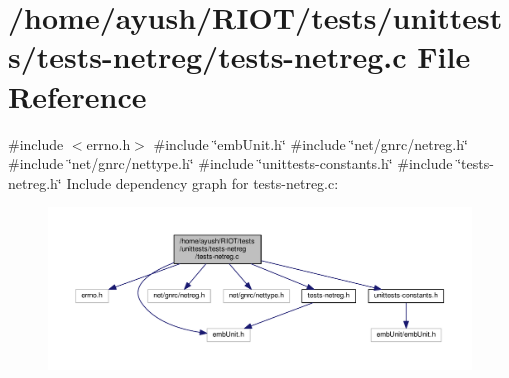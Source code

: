 \hypertarget{tests-netreg_8c}{}\section{/home/ayush/\+R\+I\+O\+T/tests/unittests/tests-\/netreg/tests-\/netreg.c File Reference}
\label{tests-netreg_8c}
{\ttfamily \#include $<$errno.\+h$>$}\newline
{\ttfamily \#include \char`\"{}emb\+Unit.\+h\char`\"{}}\newline
{\ttfamily \#include \char`\"{}net/gnrc/netreg.\+h\char`\"{}}\newline
{\ttfamily \#include \char`\"{}net/gnrc/nettype.\+h\char`\"{}}\newline
{\ttfamily \#include \char`\"{}unittests-\/constants.\+h\char`\"{}}\newline
{\ttfamily \#include \char`\"{}tests-\/netreg.\+h\char`\"{}}\newline
Include dependency graph for tests-\/netreg.c\+:
\nopagebreak
\begin{figure}[H]
\begin{center}
\leavevmode
\includegraphics[width=350pt]{tests-netreg_8c__incl}
\end{center}
\end{figure}
